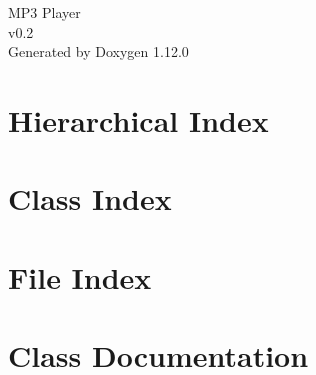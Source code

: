 \documentclass[twoside]{book}
\newcommand{\+}{\discretionary{\mbox{\scriptsize$\hookleftarrow$}}{}{}}
\newcommand{\clearemptydoublepage}{%
    \newpage{\pagestyle{empty}\cleardoublepage}%
  }
\begin{document}
  \raggedbottom
    \hypersetup{pageanchor=false,
                bookmarksnumbered=true,
                pdfencoding=unicode
               }
  \begin{titlepage}
  \vspace*{7cm}
  \begin{center}%
  {\Large MP3 Player}\\
  [1ex]\large v0.\+2 \\
  \vspace*{1cm}
  {\large Generated by Doxygen 1.12.0}\\
  \end{center}
  \end{titlepage}
  \clearemptydoublepage
  \tableofcontents
  \clearemptydoublepage
  \hypersetup{pageanchor=true}

\chapter{Hierarchical Index}

\chapter{Class Index}

\chapter{File Index}

\chapter{Class Documentation}


















\end{document}
